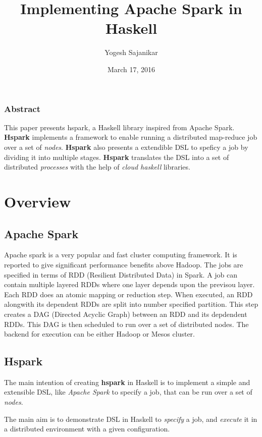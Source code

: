 \documentclass[garamond,12pt,hidelinks,colorlinks]{article}
\author{Yogesh Sajanikar}
\date{March 17, 2016}
\title{Implementing Apache Spark in Haskell}
\begin{document}
\maketitle

\subsubsection*{Abstract}
\label{sec:orgheadline1}

This paper presents hspark, a Haskell library inspired from Apache
Spark. \textbf{Hspark} implements a framework to enable running a
distributed map-reduce job over a set of \emph{nodes}. \textbf{Hspark} also
presents a extendible DSL to speficy a job by dividing it into
multiple stages. \textbf{Hspark} translates the DSL into a set of
distributed \emph{processes} with the help of \emph{cloud haskell}
libraries.  


\section{Overview}
\label{sec:orgheadline4}

\subsection{Apache Spark}
\label{sec:orgheadline2}
Apache spark is a very popular and fast cluster computing
framework. It is reported to give significant performance benefits
above Hadoop. The jobs are specified in terms of RDD (Resilient
Distributed Data) in Spark. A job can contain multiple layered RDDs
where one layer depends upon the previsou layer. Each RDD does an
atomic mapping or reduction step. When executed, an RDD alongwith
its dependent RDDs are split into number specified partition. This
step creates a DAG (Directed Acyclic Graph) between an RDD and its
depdendent RDDs. This DAG is then scheduled to run over a set of
distributed nodes. The backend for execution can be either Hadoop
or Mesos cluster. 

\subsection{Hspark}
\label{sec:orgheadline3}
The main intention of creating \textbf{hspark} in Haskell is to implement
a simple and extensible DSL, like \emph{Apache Spark} to specify a job,
that can be run over a set of \emph{nodes}.

The main aim is to demonstrate DSL in Haskell to \emph{specify} a job,
and \emph{execute} it in a distributed environment with a given
configuration. 
\end{document}
